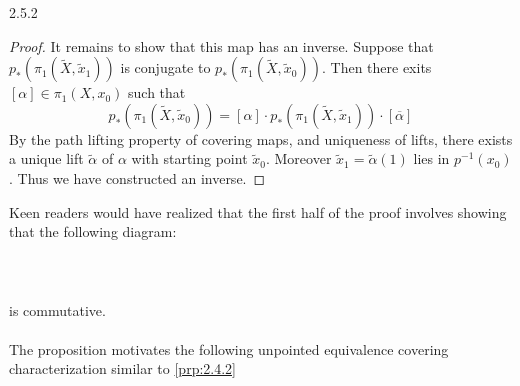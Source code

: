 \documentclass[a4paper]{article}
\begin{document}
\begin{prp}{}{2.5.2}
\begin{proof}
It remains to show that this map has an inverse. Suppose that $p_\ast(\pi_1(\tilde{X},\tilde{x}_1))$ is conjugate to $p_\ast(\pi_1(\tilde{X},\tilde{x}_0))$. Then there exits $[\alpha]\in\pi_1(X,x_0)$ such that $$p_\ast(\pi_1(\tilde{X},\tilde{x}_0))=[\alpha]\cdot p_\ast(\pi_1(\tilde{X},\tilde{x}_1))\cdot[\overline{\alpha}]$$ By the path lifting property of covering maps, and uniqueness of lifts, there exists a unique lift $\tilde{\alpha}$ of $\alpha$ with starting point $\tilde{x}_0$. Moreover $\tilde{x}_1=\tilde{\alpha}(1)$ lies in $p^{-1}(x_0)$. Thus we have constructed an inverse. 
\end{proof}
\end{prp}

Keen readers would have realized that the first half of the proof involves showing that the following diagram: \\~\\
\\~\\ 
is commutative. \\~\\

The proposition motivates the following unpointed equivalence covering characterization similar to \ref{prp:2.4.2}
\end{document}
